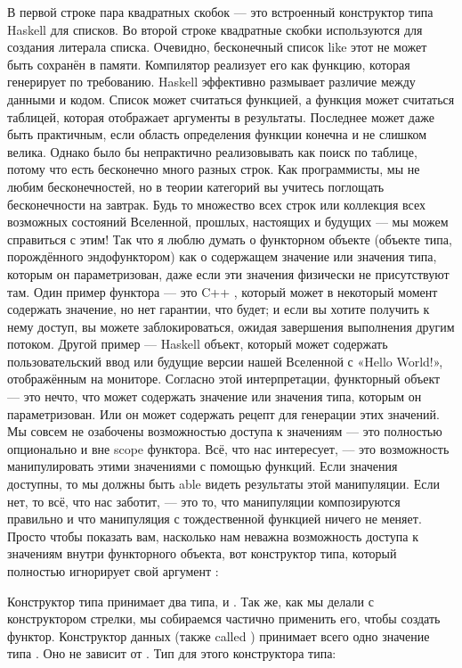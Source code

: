 В первой строке пара квадратных скобок — это встроенный конструктор типа Haskell для списков. Во второй строке квадратные скобки используются для создания литерала списка. Очевидно, бесконечный список like этот не может быть сохранён в памяти. Компилятор реализует его как функцию, которая генерирует  по требованию. Haskell эффективно размывает различие между данными и кодом. Список может считаться функцией, а функция может считаться таблицей, которая отображает аргументы в результаты. Последнее может даже быть практичным, если область определения функции конечна и не слишком велика. Однако было бы непрактично реализовывать  как поиск по таблице, потому что есть бесконечно много разных строк. Как программисты, мы не любим бесконечностей, но в теории категорий вы учитесь поглощать бесконечности на завтрак. Будь то множество всех строк или коллекция всех возможных состояний Вселенной, прошлых, настоящих и будущих — мы можем справиться с этим! Так что я люблю думать о функторном объекте (объекте типа, порождённого эндофунктором) как о содержащем значение или значения типа, которым он параметризован, даже если эти значения физически не присутствуют там. Один пример функтора — это C++ , который может в некоторый момент содержать значение, но нет гарантии, что будет; и если вы хотите получить к нему доступ, вы можете заблокироваться, ожидая завершения выполнения другим потоком. Другой пример — Haskell  объект, который может содержать пользовательский ввод или будущие версии нашей Вселенной с «Hello World!», отображённым на мониторе. Согласно этой интерпретации, функторный объект — это нечто, что может содержать значение или значения типа, которым он параметризован. Или он может содержать рецепт для генерации этих значений. Мы совсем не озабочены возможностью доступа к значениям — это полностью опционально и вне scope функтора. Всё, что нас интересует, — это возможность манипулировать этими значениями с помощью функций. Если значения доступны, то мы должны быть able видеть результаты этой манипуляции. Если нет, то всё, что нас заботит, — это то, что манипуляции композируются правильно и что манипуляция с тождественной функцией ничего не меняет. Просто чтобы показать вам, насколько нам неважна возможность доступа к значениям внутри функторного объекта, вот конструктор типа, который полностью игнорирует свой аргумент :

Конструктор типа  принимает два типа,  и . Так же, как мы делали с конструктором стрелки, мы собираемся частично применить его, чтобы создать функтор. Конструктор данных (также called ) принимает всего одно значение типа . Оно не зависит от . Тип  для этого конструктора типа:

